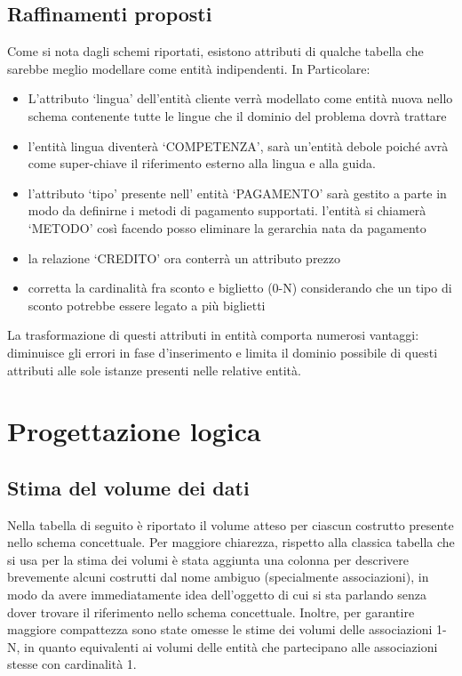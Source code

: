 \documentclass[a4paper,12pt]{report}
\begin{document}
\section{Raffinamenti proposti}
Come si nota dagli schemi riportati, esistono attributi di qualche tabella che
sarebbe meglio modellare come entità indipendenti. In Particolare:
\begin{itemize}
	\item L'attributo `lingua' dell'entità cliente verrà modellato come entità
	      nuova nello schema contenente tutte le lingue che il dominio del problema
	      dovrà trattare
	\item l'entità lingua diventerà `COMPETENZA', sarà un'entità debole poiché
	      avrà come super-chiave il riferimento esterno alla lingua e alla guida.
	\item l'attributo `tipo' presente nell' entità  `PAGAMENTO' sarà gestito a
	      parte in modo da definirne i metodi di pagamento supportati. l'entità si
	      chiamerà `METODO' così facendo posso eliminare la gerarchia nata da pagamento
	\item la relazione `CREDITO' ora conterrà un attributo prezzo
	\item corretta la cardinalità fra sconto e biglietto (0-N) considerando che un tipo di sconto
	      potrebbe essere legato a più biglietti
\end{itemize}
La trasformazione di questi attributi in entità comporta numerosi vantaggi:
diminuisce gli errori in fase d'inserimento e limita il dominio possibile di
questi attributi alle sole istanze presenti nelle relative entità.




\newpage
\chapter{Progettazione logica}
\section{Stima del volume dei dati}
Nella tabella di seguito è riportato il volume atteso per ciascun costrutto
presente nello schema concettuale. Per maggiore chiarezza, rispetto alla
classica tabella che si usa per la stima dei volumi è stata aggiunta una colonna
per descrivere brevemente alcuni costrutti dal nome ambiguo (specialmente
associazioni), in modo da avere immediatamente idea dell’oggetto di cui si sta
parlando senza dover trovare il riferimento nello schema concettuale. Inoltre,
per garantire maggiore compattezza sono state omesse le stime dei volumi delle
associazioni 1-N, in quanto equivalenti ai volumi delle entità che partecipano
alle associazioni stesse con cardinalità 1.
\end{document}

